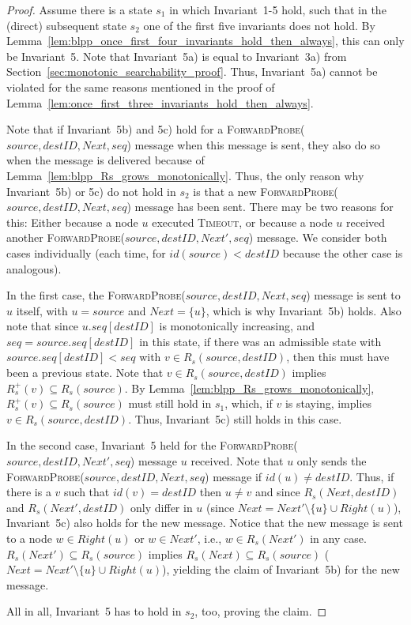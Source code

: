 \documentclass[a4paper,USenglish]{lipics}
\newcommand{\timeout}{\textsc{Timeout}\xspace}
\newcommand{\forwardprobe}[1]{\textsc{ForwardProbe(\ensuremath{#1})}\xspace}
\newcommand{\rsp}{\ensuremath{R_s^+}\xspace}
\begin{document}
\begin{proof}
 Assume there is a state $s_1$ in which Invariant~1-5 hold, such that in the (direct) subsequent state $s_2$ one of the first five invariants does not hold.
 By Lemma~\ref{lem:blpp_once_first_four_invariants_hold_then_always}, this can only be Invariant~5.
 Note that Invariant~5a) is equal to Invariant~3a) from Section~\ref{sec:monotonic_searchability_proof}.
 Thus, Invariant~5a) cannot be violated for the same reasons mentioned in the proof of Lemma~\ref{lem:once_first_three_invariants_hold_then_always}.

 Note that if Invariant~5b) and 5c) hold for a \forwardprobe{source,destID,Next,seq} message when this message is sent, they also do so when the message is delivered because of Lemma~\ref{lem:blpp_Rs_grows_monotonically}.
 Thus, the only reason why Invariant~5b) or 5c) do not hold in $s_2$ is that a new \forwardprobe{source,destID,Next,seq} message has been sent.
 There may be two reasons for this:
 Either because a node $u$ executed \timeout, or because a node $u$ received another \forwardprobe{source,destID,Next',seq} message.
 We consider both cases individually (each time, for $id(source) < destID$ because the other case is analogous).
 
 In the first case, the \forwardprobe{source,destID,Next,seq} message is sent to $u$ itself, with $u = source$ and $Next=\{u\}$, which is why Invariant~5b) holds.
 Also note that since $u.seq[destID]$ is monotonically increasing, and $seq = source.seq[destID]$ in this state, if there was an admissible state with $source.seq[destID] < seq$ with $v \in R_s(source,destID)$, then this must have been a previous state.
 Note that $v \in R_s(source,destID)$ implies $\rsp(v) \subseteq R_s(source)$.
 By Lemma~\ref{lem:blpp_Rs_grows_monotonically}, $\rsp(v) \subseteq R_s(source)$ must still hold in $s_1$, which, if $v$ is staying, implies $v \in R_s(source,destID)$.
 Thus, Invariant~5c) still holds in this case.
 
 In the second case, Invariant~5 held for the \forwardprobe{source,destID,Next',seq} message $u$ received.
 Note that $u$ only sends the \forwardprobe{source,destID,Next,seq} message if $id(u) \neq destID$.
 Thus, if there is a $v$ such that $id(v) = destID$ then $u \neq v$ and since $R_s(Next,destID)$ and $R_s(Next',destID)$ only differ in $u$ (since $Next = Next'\setminus\{u\} \cup Right(u)$), Invariant~5c) also holds for the new message. 
 Notice that the new message is sent to a node $w \in Right(u)$ or $w \in Next'$, i.e., $w \in R_s(Next')$ in any case.
 $R_s(Next') \subseteq R_s(source)$ implies $R_s(Next) \subseteq R_s(source)$ ($Next = Next'\setminus\{u\} \cup Right(u)$), yielding the claim of Invariant~5b) for the new message.
 
 All in all, Invariant~5 has to hold in $s_2$, too, proving the claim.
\end{proof}
\end{document}
